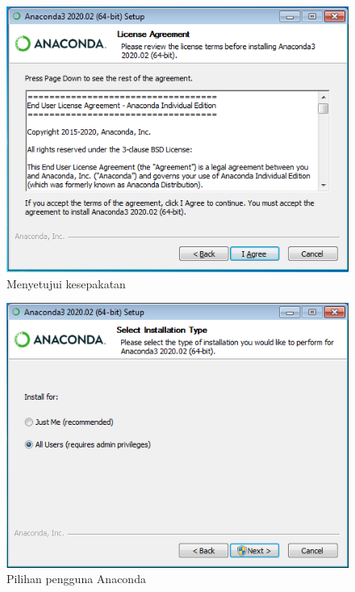 \begin{figure}[h!]
  \begin{center}
    \includegraphics[scale=.5]{pics/anacondaInstall2.png}
    \caption{Menyetujui kesepakatan}
    \label{fig:kesepakatan}
  \end{center}
\end{figure}

\begin{figure}[h!]
  \begin{center}
    \includegraphics[scale=.5]{pics/anacondaInstall3.png}
    \caption{Pilihan pengguna Anaconda}
    \label{fig:pengguna}
  \end{center}
\end{figure}

